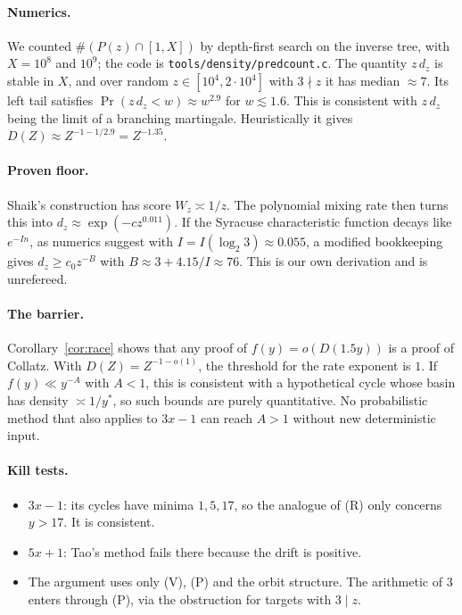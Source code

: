 \documentclass[11pt]{article}
\theoremstyle{remark}
\begin{document}
\paragraph{Numerics.} We counted $\#(P(z)\cap[1,X])$ by depth-first search on the inverse tree,
with $X=10^8$ and $10^9$; the code is \texttt{tools/density/predcount.c}. The quantity $z\,d_z$
is stable in $X$, and over random $z\in[10^4,2\cdot10^4]$ with $3\nmid z$ it has median $\approx7$.
Its left tail satisfies $\Pr(z\,d_z<w)\approx w^{2.9}$ for $w\lesssim1.6$. This is consistent
with $z\,d_z$ being the limit of a branching martingale. Heuristically it gives
$D(Z)\approx Z^{-1-1/2.9}=Z^{-1.35}$.

\paragraph{Proven floor.} Shaik's construction has score $W_z\asymp1/z$. The polynomial mixing
rate then turns this into $d_z\approx\exp(-c z^{0.011})$. If the Syracuse characteristic
function decays like $e^{-In}$, as numerics suggest with $I=I(\log_2 3)\approx0.055$, a modified
bookkeeping gives $d_z\ge c_0 z^{-B}$ with $B\approx3+4.15/I\approx76$. This is our own
derivation and is unrefereed.

\paragraph{The barrier.} Corollary~\ref{cor:race} shows that any proof of $f(y)=o(D(1.5y))$ is
a proof of Collatz. With $D(Z)=Z^{-1-o(1)}$, the threshold for the rate exponent is $1$. If
$f(y)\ll y^{-A}$ with $A<1$, this is consistent with a hypothetical cycle whose basin has density
$\asymp1/y^*$, so such bounds are purely quantitative. No probabilistic method that also applies
to $3x-1$ can reach $A>1$ without new deterministic input.

\paragraph{Kill tests.}
\begin{itemize}
\item $3x-1$: its cycles have minima $1,5,17$, so the analogue of (R) only concerns $y>17$. It
  is consistent.
\item $5x+1$: Tao's method fails there because the drift is positive.
\item The argument uses only (V), (P) and the orbit structure. The arithmetic of $3$ enters
  through (P), via the obstruction for targets with $3\mid z$.
\end{itemize}
\end{document}
